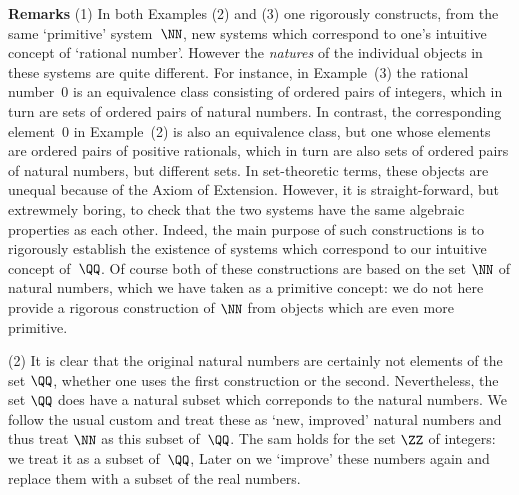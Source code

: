 {{        {\bf Remarks} (1) In both Examples (2) and (3) one rigorously constructs, from the same `primitive' system~${\NN}$,
    new systems which correspond to one's intuitive concept of `rational number'.
    However the {\em natures} of the individual objects in these systems are quite different. For instance,
    in Example~(3) the rational number~$0$ is an equivalence class consisting of ordered pairs of integers, which in turn are sets of ordered pairs of natural numbers.
    In contrast, the corresponding element~$0$ in Example~(2) is also an equivalence class,
    but one whose elements are ordered pairs of positive rationals, which in turn are also sets of ordered pairs of natural numbers, but different sets.
    In set-theoretic terms, these objects are unequal because of the Axiom of Extension.
    However, it is straight-forward, but extrewmely boring, to check that the two systems have the same algebraic properties as each other.
    Indeed, the main purpose of such constructions is to rigorously establish the existence of systems which correspond to our intuitive concept of~${\QQ}$.
    Of course both of these constructions are based on the set ${\NN}$ of natural numbers, which we have taken as a primitive concept:
    we do not here provide a rigorous construction of ${\NN}$ from objects which are even more primitive.

\V

        (2) It is clear that the original natural numbers are certainly not elements of the set ${\QQ}$,
    whether one uses the first construction or the second. Nevertheless, the set ${\QQ}$ does have a natural subset which correponds to the natural numbers.
    We follow the usual custom and treat these as `new, improved' natural numbers and thus treat ${\NN}$ as this subset of~${\QQ}$.
    The sam holds for the set ${\ZZ}$ of integers: we treat it as a subset of~${{\QQ}}$,
    Later on we `improve' these numbers again and replace them with a subset of the real numbers.

}%

}

